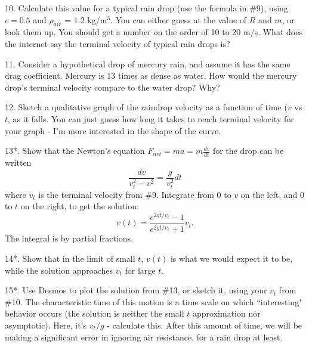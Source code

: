 \documentclass[12pt]{article}
\begin{document}
10. Calculate this value for a typical rain drop (use the formula in \#9), using $c=0.5$ and $\rho_{air}$ = 1.2 kg/m$^3$. You can either guess at the value of $R$ and $m$, or look them up. You should get a number on the order of 10 to 20 m/s. What does the internet say the terminal velocity of typical rain drops is?

11. Consider a hypothetical drop of mercury rain, and assume it has the same drag coefficient. Mercury is 13 times as dense as water. How would the mercury drop's terminal velocity compare to the water drop? Why?

12. Sketch a qualitative graph of the raindrop velocity as a function of time ($v$ vs $t$, as it falls. You can just guess how long it takes to reach terminal velocity for your graph - I'm more interested in the shape of the curve.

13*. Show that the Newton's equation $F_{net}=ma=m\frac{dv}{dt}$ for the drop can be written 
\begin{equation}
\frac{dv}{v_t^2-v^2}=\frac{g}{v_t^2}dt
 \end{equation}
where $v_t$ is the terminal velocity from \#9. Integrate from 0 to $v$ on the left, and 0 to $t$ on the right, to get the solution:
\begin{equation}
v(t)=\frac{e^{2gt/v_t}-1}{e^{2gt/v_t}+1}v_t.
 \end{equation}
The integral is by partial fractions. 

14*. Show that in the limit of small $t$, $v(t)$ is what we would expect it to be, while the solution approaches $v_t$ for large $t$. 

15*. Use Desmos to plot the solution from \#13, or sketch it, using your $v_t$ from \#10. The characteristic time of this motion is a time scale on which ``interesting" behavior occurs (the solution is neither the small $t$ approximation nor asymptotic). Here, it's $v_t/g$ - calculate this. After this amount of time, we will be making a significant error in ignoring air resistance, for a rain drop at least.
\end{document}
